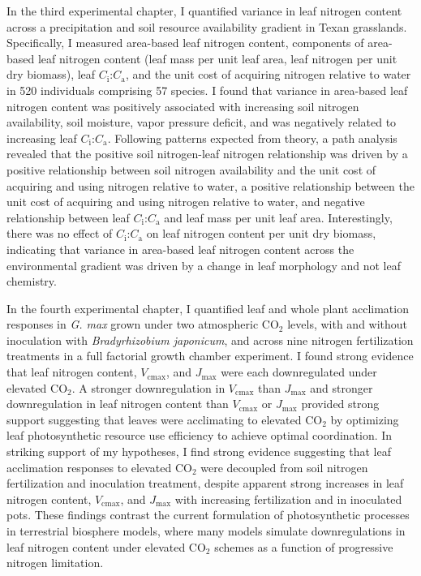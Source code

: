 In the third experimental chapter, I quantified variance in leaf nitrogen content across a precipitation and soil resource availability gradient in Texan grasslands. Specifically, I measured area-based leaf nitrogen content, components of area-based leaf nitrogen content (leaf mass per unit leaf area, leaf nitrogen per unit dry biomass), leaf $C_\mathrm{i}$:$C_\mathrm{a}$, and the unit cost of acquiring nitrogen relative to water in 520 individuals comprising 57 species. I found that variance in area-based leaf nitrogen content was positively associated with increasing soil nitrogen availability, soil moisture, vapor pressure deficit, and was negatively related to increasing leaf $C_\mathrm{i}$:$C_\mathrm{a}$. Following patterns expected from theory, a path analysis revealed that the positive soil nitrogen-leaf nitrogen relationship was driven by a positive relationship between soil nitrogen availability and the unit cost of acquiring and using nitrogen relative to water, a positive relationship between the unit cost of acquiring and using nitrogen relative to water, and negative relationship between leaf $C_\mathrm{i}$:$C_\mathrm{a}$ and leaf mass per unit leaf area. Interestingly, there was no effect of $C_\mathrm{i}$:$C_\mathrm{a}$ on leaf nitrogen content per unit dry biomass, indicating that variance in area-based leaf nitrogen content across the environmental gradient was driven by a change in leaf morphology and not leaf chemistry.

In the fourth experimental chapter, I quantified leaf and whole plant acclimation responses in \textit{G. max} grown under two atmospheric CO$_2$ levels, with and without inoculation with \textit{Bradyrhizobium japonicum}, and across nine nitrogen fertilization treatments in a full factorial growth chamber experiment. I found strong evidence that leaf nitrogen content, $V_\mathrm{cmax}$, and $J_\mathrm{max}$ were each downregulated under elevated CO$_2$. A stronger downregulation in $V_\mathrm{cmax}$ than $J_\mathrm{max}$ and stronger downregulation in leaf nitrogen content than $V_\mathrm{cmax}$ or $J_\mathrm{max}$ provided strong support suggesting that leaves were acclimating to elevated CO$_2$ by optimizing leaf photosynthetic resource use efficiency to achieve optimal coordination. In striking support of my hypotheses, I find strong evidence suggesting that leaf acclimation responses to elevated CO$_2$ were decoupled from soil nitrogen fertilization and inoculation treatment, despite apparent strong increases in leaf nitrogen content, $V_\mathrm{cmax}$, and $J_\mathrm{max}$ with increasing fertilization and in inoculated pots. These findings contrast the current formulation of photosynthetic processes in terrestrial biosphere models, where many models simulate downregulations in leaf nitrogen content under elevated CO$_2$ schemes as a function of progressive nitrogen limitation.


